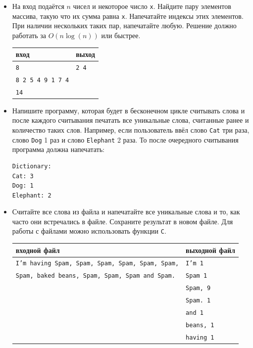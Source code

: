 \documentclass{article}
\begin{document}
\newpage
\begin{itemize}
\item На вход подаётся $n$ чисел и некоторое число \texttt{x}. Найдите пару элементов массива, такую что их сумма равна \texttt{x}. Напечатайте индексы этих элементов. При наличии нескольких таких пар, напечатайте любую. Решение должно работать за $O(n \log(n))$ или быстрее.
\begin{center}
\begin{tabular}{ l | l }
 вход & выход \\ \hline
 \texttt{8} & \texttt{2 4}  \\ 
 \texttt{8 2 5 4 9 1 7 4} &  \\
 \texttt{14} &  \\
\end{tabular}
\end{center}

\item Напишите программу, которая будет в бесконечном цикле считывать слова и после каждого считывания печатать все уникальные слова, считанные ранее и количество таких слов. Например, если пользователь ввёл слово \texttt{Cat} три раза, слово \texttt{Dog} 1 раз и слово \texttt{Elephant} 2 раза. То после очередного считывания программа должна напечатать:
\begin{verbatim}
Dictionary:
Cat: 3
Dog: 1
Elephant: 2
\end{verbatim}
\item Считайте все слова из файла и напечатайте все уникальные слова и то, как часто они встречались в файле. Сохраните результат в новом файле. Для работы с файлами можно использовать функции \texttt{C}.
\begin{center}
\begin{tabular}{ l | l }
 входной файл & выходной файл \\ \hline
 \texttt{I'm having Spam, Spam, Spam, Spam, Spam, Spam,} & \texttt{I'm 1}  \\
 \texttt{Spam, baked beans, Spam, Spam, Spam and Spam.}  &  \texttt{Spam 1}  \\
                                                         &  \texttt{Spam, 9}  \\ 
                                                         &  \texttt{Spam. 1}  \\ 
                                                         &  \texttt{and 1}  \\ 
                                                         &  \texttt{beans, 1}  \\ 
                                                         &  \texttt{having 1}  \\                                                      
\end{tabular}
\end{center}
\end{itemize}
\end{document}
